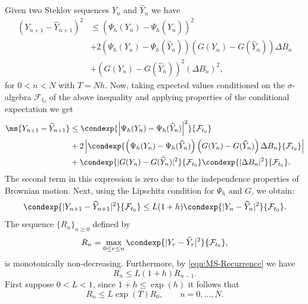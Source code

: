     \begin{Proof}
      Given two Steklov sequences $Y_n$ and $\widehat{Y}_n$ we have
      \begin{align*}
	\left(Y_{n+1}-\widehat{Y}_{n+1}\right)^ 2
	  &\leq
	  \left(
	    \Psi_h(Y_n)
	    -
	    \Psi_h(\widehat{Y}_n)
	  \right)^2 \\
	  &+
	  2\left(
	  \Psi_h(Y_n)
	    -
	  \Psi_h(\widehat{Y}_n)
	  \right)
	  \left(
	    G(Y_n)-G(\widehat{Y}_n)
	  \right)
	  \Delta B_n\\
	   &+
	  (G(Y_n)-G(\widehat{Y}_n))^2
	  (\Delta B_n)^2,
      \end{align*}
      for $0<n<N$ with $T=Nh$. Now, taking expected values conditioned on the
      $\sigma$-algebra $\mathcal{F}_{t_0}$ of the above inequality and applying
      properties of the conditional expectation we get
      \begin{align*}
	  \ms{Y_{n+1}-\widehat{Y}_{n+1}}
	  &\leq
	  \condexp{
	    \left|
	      \Psi_h(Y_n)
	      -
	      \Psi_h(\widehat{Y}_n)
	    \right|^2
	  }{\mathcal{F}_{t_0}}
	  \\
	  &+
	  2\left|
	  \condexp{
	    \left(
	      \Psi_h(Y_n)
	      -
	      \Psi_h(\widehat{Y}_n)
	    \right)
	  \left(
	    G(Y_n)-G(\widehat{Y}_n)
	  \right)
	  \Delta B_n}{\mathcal{F}_{t_0}}
	  \right| \\
	  &+
	  \condexp{|G(Y_n)-G(\widehat{Y}_n)|^2}{\mathcal{F}_{t_0}}
	  \condexp{|\Delta B_n|^2}{\mathcal{F}_{t_0}}.
      \end{align*}
      The second term in this expression is zero due to the independence properties of
      Brownian motion. Next, using the Lipschitz condition for $\Psi_h$ and $G$, we
      obtain:
      \begin{equation}\label{eqn:MS-Recurrence}
	\condexp{|Y_{n+1}-\widehat{Y}_{n+1}|^2}{\mathcal{F}_{t_0}}
	\leq L(1+h)
	\condexp{|Y_{n}-\widehat{Y}_{n}|^ 2}{\mathcal{F}_{t_0}}.
      \end{equation}
      The sequence $\{R_n\}_{n\geq 0}$ defined by 
      $$
	R_n=\max_{0\leq r\leq n}\condexp{|Y_r-\widehat{Y}_r|^2}
	{\mathcal{F}_{t_0}},
      $$
      is monotonically non-decreasing. Furthermore, by \eqref{eqn:MS-Recurrence} we have
      \begin{equation}\label{eqn:AMS-Stability}
	R_n \leq L(1+h)R_{n-1}.
      \end{equation}
      First suppose $0<L<1$, since $1+h\leq \exp(h)$ it follows that
      \begin{equation}
	R_n\leq L \exp(T)R_0, \qquad n=0,\dots,N.

\end{equation}
\end{Proof}
